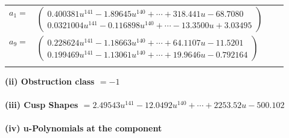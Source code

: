 \documentclass[1p]{elsarticle_modified}
\theoremstyle{definition}
\begin{document}
\begin{tabular}{m{7pt} m{180pt} m{7pt} m{180pt} }
\flushright $a_{1}=$&$\begin{pmatrix}0.400381 u^{141}-1.89645 u^{140}+\cdots+318.441 u-68.7080\\0.0321004 u^{141}-0.116898 u^{140}+\cdots-13.3500 u+3.03495\end{pmatrix}$ \\
\flushright $a_{9}=$&$\begin{pmatrix}0.228624 u^{141}-1.18663 u^{140}+\cdots+64.1107 u-11.5201\\0.199469 u^{141}-1.13061 u^{140}+\cdots+19.9646 u-0.792164\end{pmatrix}$\\&\end{tabular}
\flushleft \textbf{(ii) Obstruction class $= -1$}\\~\\
\flushleft \textbf{(iii) Cusp Shapes $= 2.49543 u^{141}-12.0492 u^{140}+\cdots+2253.52 u-500.102$}\\~\\
\newpage\renewcommand{\arraystretch}{1}
\flushleft \textbf{(iv) u-Polynomials at the component}\newline \\
\end{document}
